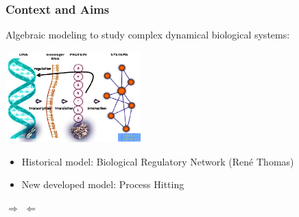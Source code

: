 
\begin{frame}[c]
  \frametitle{Context and Aims}

Algebraic modeling to study complex dynamical biological systems:

\begin{center}
  \includegraphics[height=3.5cm]{figs/dnascheme_white.png}
\end{center}

\pause
\begin{itemize}
  \item Historical model: Biological Regulatory Network (René Thomas)
  \item New developed model: Process Hitting
\end{itemize}

\textcolor{couleurtheme}{$\Rightarrow$}  \textcolor{couleurtheme}{$\Leftarrow$}

\end{frame}
